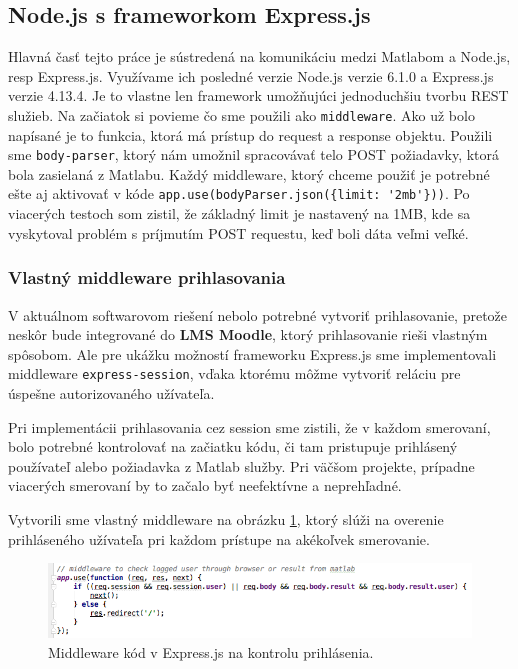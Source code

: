 
\subsection{Node.js s frameworkom Express.js}
Hlavná časť tejto práce je sústredená na komunikáciu medzi Matlabom a Node.js, resp Express.js. Využívame ich posledné verzie Node.js verzie 6.1.0 a Express.js verzie 4.13.4. Je to vlastne len framework umožňujúci jednoduchšiu tvorbu REST služieb. Na začiatok si povieme čo sme použili ako \verb|middleware|. Ako už bolo napísané je to funkcia, ktorá má prístup do request a response objektu. Použili sme \verb|body-parser|, ktorý nám umožnil spracovávať telo POST požiadavky, ktorá bola zasielaná z Matlabu. Každý middleware, ktorý chceme použiť je potrebné ešte aj aktivovať v kóde \verb|app.use(bodyParser.json({limit: '2mb'}))|. Po viacerých testoch som zistil, že základný limit je nastavený na 1MB, kde sa vyskytoval problém s príjmutím POST requestu, keď boli dáta veľmi veľké.

\subsubsection{Vlastný middleware prihlasovania}
V aktuálnom softwarovom riešení nebolo potrebné vytvoriť prihlasovanie, pretože neskôr bude integrované do \textbf{LMS Moodle}, ktorý prihlasovanie rieši vlastným spôsobom. Ale pre ukážku možností frameworku Express.js sme implementovali middleware \verb|express-session|, vďaka ktorému môžme vytvoriť reláciu pre úspešne autorizovaného užívateľa. 

Pri implementácii prihlasovania cez session sme zistili, že v každom smerovaní, bolo potrebné kontrolovať na začiatku kódu, či tam pristupuje prihlásený používateľ alebo požiadavka z Matlab služby. Pri väčšom projekte, prípadne viacerých smerovaní by to začalo byť neefektívne a neprehľadné. 

Vytvorili sme vlastný middleware na obrázku \ref{img-code-express-middleware}, ktorý slúži na overenie prihláseného užívateľa pri každom prístupe na akékoľvek smerovanie.

\begin{figure}[H]
  \centering
  \includegraphics[scale=0.6]{img/code/express-middleware.png}
  \caption{Middleware kód v Express.js na kontrolu prihlásenia.}
  \label{img-code-express-middleware}
\end{figure}

